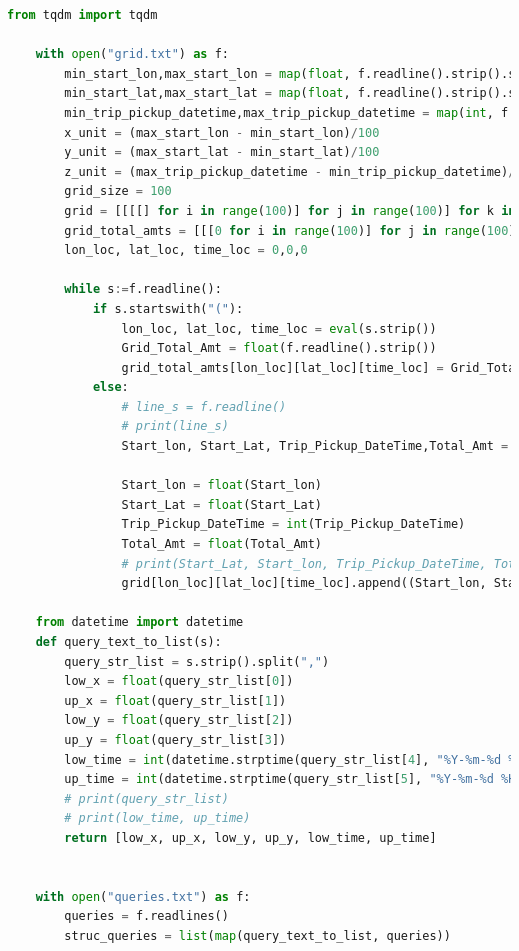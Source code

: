 \documentclass{article}
\begin{document}
\begin{lstlisting}[language=Python, caption=Task 2, label=task2, breaklines=true]
    from tqdm import tqdm

    with open("grid.txt") as f:
        min_start_lon,max_start_lon = map(float, f.readline().strip().split(","))
        min_start_lat,max_start_lat = map(float, f.readline().strip().split(","))
        min_trip_pickup_datetime,max_trip_pickup_datetime = map(int, f.readline().strip().split(","))
        x_unit = (max_start_lon - min_start_lon)/100
        y_unit = (max_start_lat - min_start_lat)/100
        z_unit = (max_trip_pickup_datetime - min_trip_pickup_datetime)/100
        grid_size = 100
        grid = [[[[] for i in range(100)] for j in range(100)] for k in range(100)]
        grid_total_amts = [[[0 for i in range(100)] for j in range(100)] for k in range(100)]
        lon_loc, lat_loc, time_loc = 0,0,0
        
        while s:=f.readline():
            if s.startswith("("):
                lon_loc, lat_loc, time_loc = eval(s.strip())
                Grid_Total_Amt = float(f.readline().strip())
                grid_total_amts[lon_loc][lat_loc][time_loc] = Grid_Total_Amt
            else:
                # line_s = f.readline()
                # print(line_s)
                Start_lon, Start_Lat, Trip_Pickup_DateTime,Total_Amt = s.strip().split(",")
                
                Start_lon = float(Start_lon)
                Start_Lat = float(Start_Lat)
                Trip_Pickup_DateTime = int(Trip_Pickup_DateTime)
                Total_Amt = float(Total_Amt)
                # print(Start_Lat, Start_lon, Trip_Pickup_DateTime, Total_Amt)
                grid[lon_loc][lat_loc][time_loc].append((Start_lon, Start_Lat, Trip_Pickup_DateTime, Total_Amt))
                
    from datetime import datetime
    def query_text_to_list(s):
        query_str_list = s.strip().split(",")
        low_x = float(query_str_list[0])
        up_x = float(query_str_list[1])
        low_y = float(query_str_list[2])
        up_y = float(query_str_list[3])
        low_time = int(datetime.strptime(query_str_list[4], "%Y-%m-%d %H:%M:%S").timestamp())*1000000000
        up_time = int(datetime.strptime(query_str_list[5], "%Y-%m-%d %H:%M:%S").timestamp())*1000000000
        # print(query_str_list)
        # print(low_time, up_time)
        return [low_x, up_x, low_y, up_y, low_time, up_time]
        
    
    with open("queries.txt") as f:
        queries = f.readlines()
        struc_queries = list(map(query_text_to_list, queries))
    

\end{lstlisting}
\end{document}
